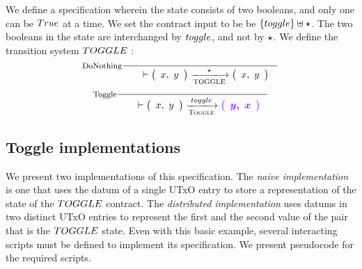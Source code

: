 We define a specification wherein
the state consists of two booleans, and only one can be $\true$
at a time. We set the contract input to be
be $\{\toggle \} \uniondistinct \emptytype$.
The two booleans in the state are interchanged by $\toggle$, and not by $\star$.
We define the transition system $\TOGGLE$ :
  \begin{equation}
    \inference[DoNothing]
    { \\
    }
    {
    \begin{array}{l}
      \\
    \end{array}
      \vdash
      \left(
      \begin{array}{r}
        x, ~y
      \end{array}
      \right)
      \trans{TOGGLE}{\emptytype}
      \left(
      \begin{array}{r}
        x, ~y
      \end{array}
      \right) \\
    }
  \end{equation}
  \begin{equation}
    \inference[Toggle]
    {~\\
    }
    {
    \begin{array}{l}
      \\
    \end{array}
      \vdash
      \left(
      \begin{array}{r}
        x,~y
      \end{array}
      \right)
      \trans{Toggle}{toggle}
      \varUpdate{\left(
      \begin{array}{r}
        y,~x
      \end{array}
      \right) } \\
    }
  \end{equation}

\subsection{Toggle implementations}

We present two implementations of this specification. The \emph{naive implementation}
is one that uses the datum of a single UTxO entry to store a representation of the state of the
$\TOGGLE$ contract. The \emph{distributed implementation} uses datums in two distinct UTxO
entries to represent the first and the second value of the pair that is the $\TOGGLE$ state.
Even with this basic example, several interacting scripts must be defined to implement
its specification. We present pseudocode for the required scripts.

